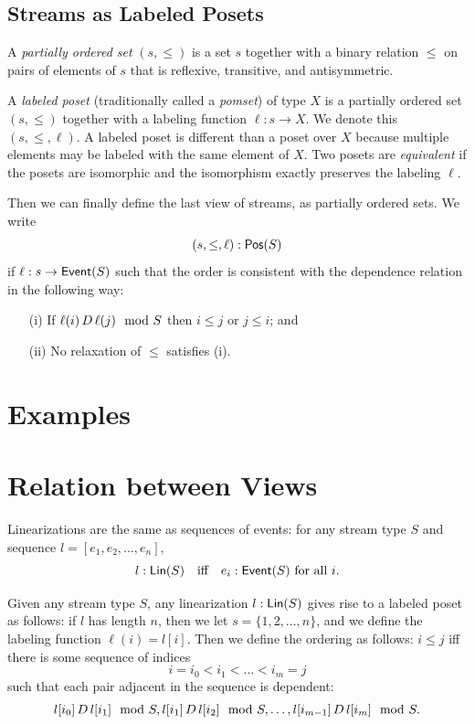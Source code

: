 \subsection{Streams as Labeled Posets}

A \emph{partially ordered set} $(s, \le)$ is a set $s$ together with a binary relation $\le$ on pairs of elements of $s$ that is reflexive, transitive, and antisymmetric.

A \emph{labeled poset} (traditionally called a \emph{pomset}) of type $X$ is a
partially ordered set $(s, \le)$ together with a labeling function $\ell: s \to X$. We denote this $(s, \le, \ell)$. A labeled poset is different than a poset over $X$ because multiple elements may be labeled with the same element of $X$.
Two posets are \emph{equivalent} if the posets are isomorphic and the isomorphism exactly preserves the labeling $\ell$.

Then we can finally define the last view of streams, as partially ordered sets.
We write
\[
(s, \le, \ell): \mathsf{Pos}({S})
\]
if $\ell: s \to \mathsf{Event}(S)$ such that the order is consistent with the dependence
relation in the following way:
\begin{enumerate}
\item[(i)] If $\ell(i) \,D\, \ell(j) \mod {S}$ then $i \le j$ or $j \le i$; and
\item[(ii)] No relaxation of $\le$ satisfies (i).
\end{enumerate}

\section{Examples}


\section{Relation between Views}

\begin{proposition}
Linearizations are the same as sequences of events:
for any stream type $S$ and sequence $l = [e_1, e_2, \ldots, e_n]$,
\[
l: \mathsf{Lin}({S}) \quad \text{iff} \quad e_i: \mathsf{Event}({S}) \text{ for all } i.
\]
\end{proposition}

Given any stream type $S$, any linearization $l: \mathsf{Lin}({S})$ gives rise to a labeled poset as follows:
if $l$ has length $n$, then we let $s = \{1, 2, \ldots, n\}$, and we define the labeling function $\ell(i) = l[i]$.
Then we define the ordering as follows:
$i \le j$ iff there is some sequence of indices
\[
i = i_0 < i_1 < \ldots < i_m = j
\]
such that each pair adjacent in the sequence is dependent:
\[
l[i_0] \,D\, l[i_1] \mod {S}, l[i_1] \,D\, l[i_2] \mod {S}, \ldots, l[i_{m-1}] \,D\, l[i_m] \mod {S}.
\]

